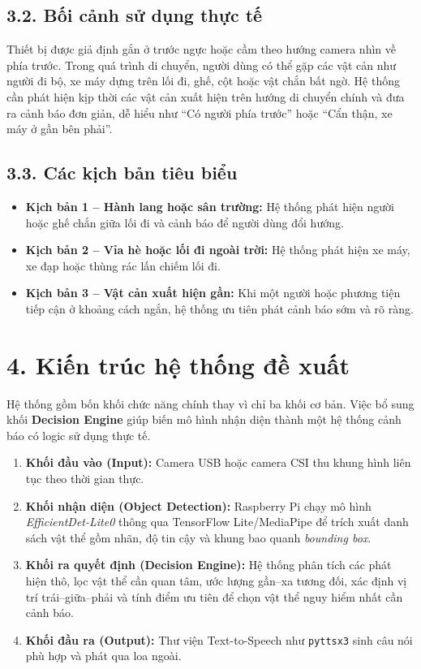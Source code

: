 \documentclass[11pt, a4paper]{article}
\begin{document}
\subsection*{3.2. Bối cảnh sử dụng thực tế}
Thiết bị được giả định gắn ở trước ngực hoặc cầm theo hướng camera nhìn về phía trước. Trong quá trình di chuyển, người dùng có thể gặp các vật cản như người đi bộ, xe máy dựng trên lối đi, ghế, cột hoặc vật chắn bất ngờ. Hệ thống cần phát hiện kịp thời các vật cản xuất hiện trên hướng di chuyển chính và đưa ra cảnh báo đơn giản, dễ hiểu như ``Có người phía trước'' hoặc ``Cẩn thận, xe máy ở gần bên phải''.

\subsection*{3.3. Các kịch bản tiêu biểu}
\begin{itemize}
    \item \textbf{Kịch bản 1 -- Hành lang hoặc sân trường:} Hệ thống phát hiện người hoặc ghế chắn giữa lối đi và cảnh báo để người dùng đổi hướng.
    \item \textbf{Kịch bản 2 -- Vỉa hè hoặc lối đi ngoài trời:} Hệ thống phát hiện xe máy, xe đạp hoặc thùng rác lấn chiếm lối đi.
    \item \textbf{Kịch bản 3 -- Vật cản xuất hiện gần:} Khi một người hoặc phương tiện tiếp cận ở khoảng cách ngắn, hệ thống ưu tiên phát cảnh báo sớm và rõ ràng.
\end{itemize}

\section*{4. Kiến trúc hệ thống đề xuất}
Hệ thống gồm bốn khối chức năng chính thay vì chỉ ba khối cơ bản. Việc bổ sung khối \textbf{Decision Engine} giúp biến mô hình nhận diện thành một hệ thống cảnh báo có logic sử dụng thực tế.

\begin{enumerate}[itemsep=3pt, topsep=3pt]
    \item \textbf{Khối đầu vào (Input):} Camera USB hoặc camera CSI thu khung hình liên tục theo thời gian thực.
    \item \textbf{Khối nhận diện (Object Detection):} Raspberry Pi chạy mô hình \textit{EfficientDet-Lite0} thông qua TensorFlow Lite/MediaPipe để trích xuất danh sách vật thể gồm nhãn, độ tin cậy và khung bao quanh \textit{bounding box}.
    \item \textbf{Khối ra quyết định (Decision Engine):} Hệ thống phân tích các phát hiện thô, lọc vật thể cần quan tâm, ước lượng gần--xa tương đối, xác định vị trí trái--giữa--phải và tính điểm ưu tiên để chọn vật thể nguy hiểm nhất cần cảnh báo.
    \item \textbf{Khối đầu ra (Output):} Thư viện Text-to-Speech như \texttt{pyttsx3} sinh câu nói phù hợp và phát qua loa ngoài.
\end{enumerate}
\end{document}
